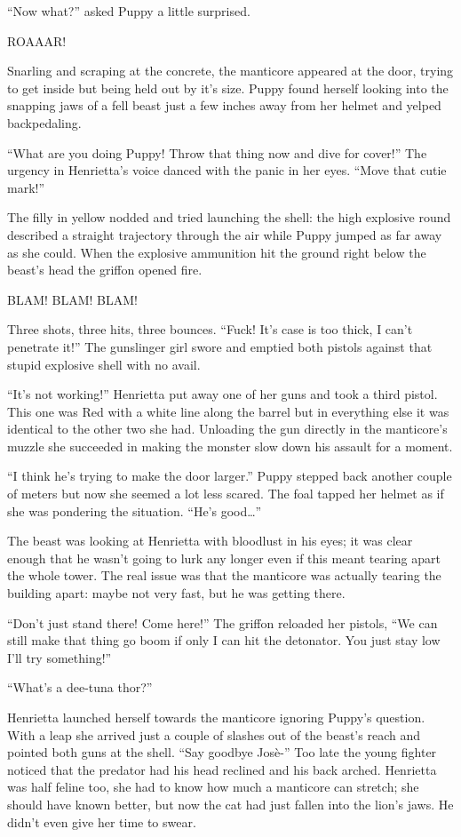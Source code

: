 ``Now what?'' asked Puppy a little surprised.

ROAAAR!

Snarling and scraping at the concrete, the manticore appeared at the door, trying to get inside but being held out by it's size. Puppy found herself looking into the snapping jaws of a fell beast just a few inches away from her helmet and yelped backpedaling.

``What are you doing Puppy! Throw that thing now and dive for cover!'' The urgency in Henrietta's voice danced with the panic in her eyes. ``Move that cutie mark!''

The filly in yellow nodded and tried launching the shell: the high explosive round described a straight trajectory through the air while Puppy jumped as far away as she could. When the explosive ammunition hit the ground right below the beast's head the griffon opened fire.

BLAM! BLAM! BLAM!

Three shots, three hits, three bounces. ``Fuck! It's case is too thick, I can't penetrate it!'' The gunslinger girl swore and emptied both pistols against that stupid explosive shell with no avail.

``It's not working!'' Henrietta put away one of her guns and took a third pistol. This one was Red with a white line along the barrel but in everything else it was identical to the other two she had. Unloading the gun directly in the manticore's muzzle she succeeded in making the monster slow down his assault for a moment.

``I think he's trying to make the door larger.'' Puppy stepped back another couple of meters but now she seemed a lot less scared. The foal tapped her helmet as if she was pondering the situation. ``He's good\dots''

The beast was looking at Henrietta with bloodlust in his eyes; it was clear enough that he wasn't going to lurk any longer even if this meant tearing apart the whole tower. The real issue was that the manticore was actually tearing the building apart: maybe not very fast, but he was getting there.

``Don't just stand there! Come here!'' The griffon reloaded her pistols, ``We can still make that thing go boom if only I can hit the detonator. You just stay low I'll try something!''

``What's a dee-tuna thor?''

Henrietta launched herself towards the manticore ignoring Puppy's question. With a leap she arrived just a couple of slashes out of the beast's reach and pointed both guns at the shell. ``Say goodbye Josè-'' Too late the young fighter noticed that the predator had his head reclined and his back arched. Henrietta was half feline too, she had to know how much a manticore can stretch; she should have known better, but now the cat had just fallen into the lion's jaws. He didn't even give her time to swear.

